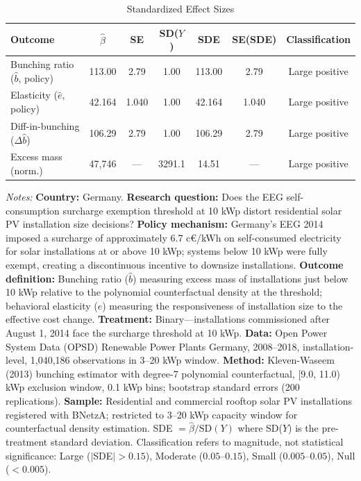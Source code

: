 \begin{table}[htbp]
\centering
\caption{Standardized Effect Sizes}
\label{tab:sde}
\begin{tabular}{lcccccc}
\hline\hline
Outcome & $\hat{\beta}$ & SE & SD($Y$) & SDE & SE(SDE) & Classification \\
\hline
Bunching ratio ($\hat{b}$, policy) & 113.00 & 2.79 & 1.00 & 113.00 & 2.79 & Large positive \\
Elasticity ($\hat{e}$, policy) & 42.164 & 1.040 & 1.00 & 42.164 & 1.040 & Large positive \\
Diff-in-bunching ($\Delta\hat{b}$) & 106.29 & 2.79 & 1.00 & 106.29 & 2.79 & Large positive \\
Excess mass (norm.) & 47,746 & --- & 3291.1 & 14.51 & --- & Large positive \\
\hline\hline
\end{tabular}
\begin{tablenotes}
\small
\item \textit{Notes:} \textbf{Country:} Germany. \textbf{Research question:} Does the EEG self-consumption surcharge exemption threshold at 10 kWp distort residential solar PV installation size decisions? \textbf{Policy mechanism:} Germany's EEG 2014 imposed a surcharge of approximately 6.7 c\euro/kWh on self-consumed electricity for solar installations at or above 10 kWp; systems below 10 kWp were fully exempt, creating a discontinuous incentive to downsize installations. \textbf{Outcome definition:} Bunching ratio ($\hat{b}$) measuring excess mass of installations just below 10 kWp relative to the polynomial counterfactual density at the threshold; behavioral elasticity ($\hat{e}$) measuring the responsiveness of installation size to the effective cost change. \textbf{Treatment:} Binary---installations commissioned after August 1, 2014 face the surcharge threshold at 10 kWp. \textbf{Data:} Open Power System Data (OPSD) Renewable Power Plants Germany, 2008--2018, installation-level, 1,040,186 observations in 3--20 kWp window. \textbf{Method:} Kleven-Waseem (2013) bunching estimator with degree-7 polynomial counterfactual, [9.0, 11.0) kWp exclusion window, 0.1 kWp bins; bootstrap standard errors (200 replications). \textbf{Sample:} Residential and commercial rooftop solar PV installations registered with BNetzA; restricted to 3--20 kWp capacity window for counterfactual density estimation. SDE $= \hat{\beta} / \text{SD}(Y)$ where SD($Y$) is the pre-treatment standard deviation. Classification refers to magnitude, not statistical significance: Large ($|$SDE$| > 0.15$), Moderate ($0.05$--$0.15$), Small ($0.005$--$0.05$), Null ($< 0.005$). 
\end{tablenotes}
\end{table}
